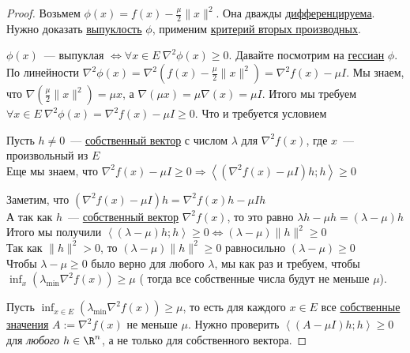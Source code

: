 \begin{proof}
  Возьмем $\phi(x) = f(x) - \frac{\mu}{2} \|x\|^2$. Она дважды \hyperref[note:957FA09D-8883-40A5-B4C7-237D9F815A42]{дифференцируема}.
  Нужно доказать \hyperref[note:1CA14F2C-637F-41DE-9E97-72075D19E97F]{выпуклость} $\phi$, применим \hyperref[note:86FCE16B-C82E-4416-851C-0E0AD0FDA382]{критерий вторых производных}.

  $\phi(x)$~--- выпуклая $\Leftrightarrow \forall x \in E\ \nabla^2 \phi(x) \ge 0$. Давайте посмотрим на \hyperref[note:592AD816-1D80-48E6-8399-8524FBC1E8F3]{гессиан} $\phi$.
  По линейности $\nabla^2 \phi(x) = \nabla^2 \left( f(x) - \frac{\mu}{2} \| x \|^2 \right) = \nabla^2 f(x)- \mu I$.
  Мы знаем, что $\nabla \left( \frac{\mu}{2} \| x \|^2 \right) = \mu x$, а $\nabla (\mu x) = \mu \nabla (x) = \mu I$.
  Итого мы требуем $\forall x \in E\ \nabla^2\phi(x) = \nabla^2 f(x) - \mu I \ge 0$. Что и требуется условием

  \proofstep{$\Rightarrow$}
  Пусть $h \ne 0$~--- \hyperref[note:57D369D6-D748-41A2-9BDA-38D2FFC6601A]{собственный вектор} с числом $\lambda$ для $\nabla^2 f(x)$, где $x$~--- произвольный из $E$ \\
  Еще мы знаем, что $\nabla^2 f(x) -\mu I \ge 0 \Rightarrow \left\langle (\nabla^2 f(x) - \mu I)h; h\right\rangle \ge 0$

  Заметим, что $(\nabla^2 f(x) - \mu I) h = \nabla^2 f(x) h - \mu I h$ \\
  А так как $h$~--- \hyperref[note:57D369D6-D748-41A2-9BDA-38D2FFC6601A]{собственный вектор} $\nabla^2 f(x)$, то это равно $\lambda h - \mu h = (\lambda - \mu) h$ \\
  Итого мы получили $\left\langle (\lambda-\mu) h; h \right\rangle \ge 0 \Leftrightarrow (\lambda - \mu) \| h \|^2 \ge 0$ \\
  Так как $\| h \|^2 > 0$, то $(\lambda - \mu) \| h \|^2 \ge 0$ равносильно $(\lambda - \mu) \ge 0$ \\
  Чтобы $\lambda -\mu \ge 0$ было верно для любого $\lambda$, мы как раз и требуем, чтобы $\inf_x (\lambda_{\mathrm{min}} \nabla^2f(x)) \ge \mu$ ( тогда все собственные числа будут не меньше $\mu$).

  \proofstep{$\Leftarrow$}
  Пусть $\inf_{x \in E} (\lambda_{\mathrm{min}} \nabla^2 f(x)) \ge \mu$, то есть для каждого $x \in E$ все \hyperref[note:9D2905FC-8E68-4E6F-9243-364269F795B0]{собственные значения} $A := \nabla^2 f(x)$ не меньше $\mu$.
  Нужно проверить $\left\langle (A - \mu I)h; h \right\rangle \ge 0$ для \emph{любого} $h \in \R^n$, а не только для собственного вектора.


\end{proof}
